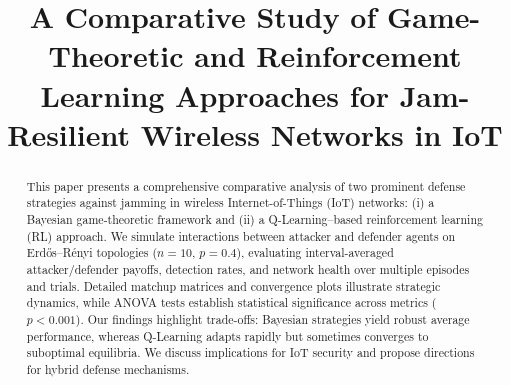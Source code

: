 \documentclass[conference]{IEEEtran}
\begin{document}

\title{A Comparative Study of Game-Theoretic and Reinforcement Learning Approaches for Jam-Resilient Wireless Networks in IoT}

\author{
  \and
  \and
}

\maketitle

\begin{abstract}
This paper presents a comprehensive comparative analysis of two prominent defense strategies against jamming in wireless Internet-of-Things (IoT) networks: (i) a Bayesian game-theoretic framework and (ii) a Q-Learning–based reinforcement learning (RL) approach. We simulate interactions between attacker and defender agents on Erd\H{o}s–R\'enyi topologies ($n=10$, $p=0.4$), evaluating interval-averaged attacker/defender payoffs, detection rates, and network health over multiple episodes and trials. Detailed matchup matrices and convergence plots illustrate strategic dynamics, while ANOVA tests establish statistical significance across metrics ($p<0.001$). Our findings highlight trade-offs: Bayesian strategies yield robust average performance, whereas Q-Learning adapts rapidly but sometimes converges to suboptimal equilibria. We discuss implications for IoT security and propose directions for hybrid defense mechanisms.
\end{abstract}
\end{document}
